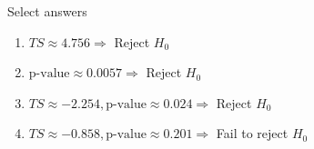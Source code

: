 \documentclass{article}
\newcommand{\ho}{H_0}		%
\begin{document}
\vspace{50pt}

Select answers\bigskip
\begin{enumerate}
    \item $TS \approx 4.756 \Longrightarrow$ Reject $\ho$
    
    \item $\text{p-value} \approx 0.0057 \Longrightarrow$ Reject $\ho$
    
    \item $TS \approx -2.254, \text{p-value} \approx 0.024 \Longrightarrow$ Reject $\ho$
    
    \item $TS \approx -0.858, \text{p-value} \approx 0.201 \Longrightarrow$ Fail to reject $\ho$
    
\end{enumerate}
\end{document}
